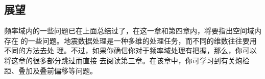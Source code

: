\subsection{展望}
频率域内的一些问题已在上面总结过了，在这一章和第四章内，将要指出空间域内存在
的一些问题。地震数据处理是一种多维的处理任务，而不同的维数往往要用不同的方法去处
理。不过，如果你确信你对于频率域处理有把握，那么，你可以将这章的很多部分跳过而直接
去阅读第三章。在该章中，你可学习到有关炮检距、叠加及叠前偏移等问题。
